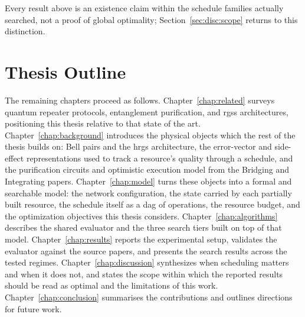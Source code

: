Every result above is an existence claim within the schedule families actually searched, not a proof of global optimality; Section~\ref{sec:disc:scope} returns to this distinction.

\section{Thesis Outline}
\label{sec:intro:outline}

The remaining chapters proceed as follows. Chapter~\ref{chap:related} surveys quantum repeater protocols, entanglement purification, and \Glspl{rgs} architectures, positioning this thesis relative to that state of the art. Chapter~\ref{chap:background} introduces the physical objects which the rest of the thesis builds on: Bell pairs and the \Gls{hrgs} architecture, the error-vector and side-effect representations used to track a resource's quality through a schedule, and the purification circuits and optimistic execution model from the Bridging and Integrating papers. Chapter~\ref{chap:model} turns these objects into a formal and searchable model: the network configuration, the state carried by each partially built resource, the schedule itself as a \Gls{dag} of operations, the resource budget, and the optimization objectives this thesis considers. Chapter~\ref{chap:algorithms} describes the shared evaluator and the three search tiers built on top of that model. Chapter~\ref{chap:results} reports the experimental setup, validates the evaluator against the source papers, and presents the search results across the tested regimes. Chapter~\ref{chap:discussion} synthesizes when scheduling matters and when it does not, and states the scope within which the reported results should be read as optimal and the limitations of this work. Chapter~\ref{chap:conclusion} summarises the contributions and outlines directions for future work.
